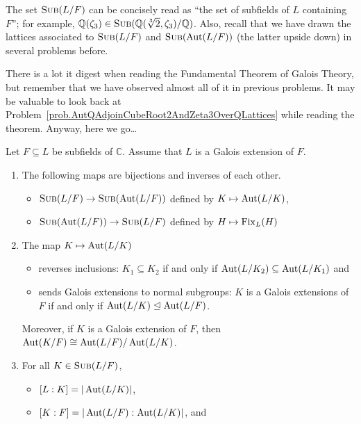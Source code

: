 The set $\operatorname{\textsc{Sub}}(L/F)$ can be concisely read as ``the set of subfields of $L$ containing $F$''; for example, $\mathbb{Q}(\zeta_3) \in \operatorname{\textsc{Sub}}(\mathbb{Q}(\sqrt[3]{2},\zeta_3)/\mathbb{Q})$. Also, recall that we have drawn the lattices associated to $\operatorname{\textsc{Sub}}(L/F)$ and $\operatorname{\textsc{Sub}}(\operatorname{Aut}(L/F))$ (the latter upside down) in several problems before. 

There is a lot it digest when reading the Fundamental Theorem of Galois Theory, but remember that we have observed almost all of it in previous problems. It may be valuable to look back at Problem~\ref{prob.AutQAdjoinCubeRoot2AndZeta3OverQLattices} while reading the theorem. Anyway, here we go\ldots

\begin{fact}\label{fact.FTGT}
Let $F\subseteq L$ be subfields of $\mathbb{C}$. Assume that $L$ is a Galois extension of $F$. \begin{enumerate}
\item The following maps are bijections and inverses of each other.
\begin{itemize}
\item $\operatorname{\textsc{Sub}}(L/F)\to \operatorname{\textsc{Sub}}(\operatorname{Aut}(L/F))$ defined by $K\mapsto \operatorname{Aut}(L/K)$,
\item $\operatorname{\textsc{Sub}}(\operatorname{Aut}(L/F))\to \operatorname{\textsc{Sub}}(L/F)$ defined by $H\mapsto \operatorname{Fix}_L(H)$
\end{itemize} 
\item\label{fact.FTGT.InclusionReverseAndGaloisToNormal} The map $K\mapsto \operatorname{Aut}(L/K)$ 
\begin{itemize}
\item reverses inclusions: $K_1\subseteq K_2$ if and only if $\operatorname{Aut}(L/K_2) \subseteq \operatorname{Aut}(L/K_1)$ and
\item sends Galois extensions to normal subgroups: $K$ is a Galois extensions of $F$ if and only if $\operatorname{Aut}(L/K)\trianglelefteq \operatorname{Aut}(L/F)$.
\end{itemize}
Moreover, if $K$ is a Galois extension of $F$, then $\operatorname{Aut}(K/F)\cong \operatorname{Aut}(L/F)/\operatorname{Aut}(L/K)$.
\item For all $K\in \operatorname{\textsc{Sub}}(L/F)$, 
\begin{itemize}\label{fact.FTGT.DegreeMatchesIndex}
\item $[L:K] = |\operatorname{Aut}(L/K)|$,
\item $[K:F] = |\operatorname{Aut}(L/F):\operatorname{Aut}(L/K)|$, and 
\end{itemize}
\end{enumerate}
\end{fact}

